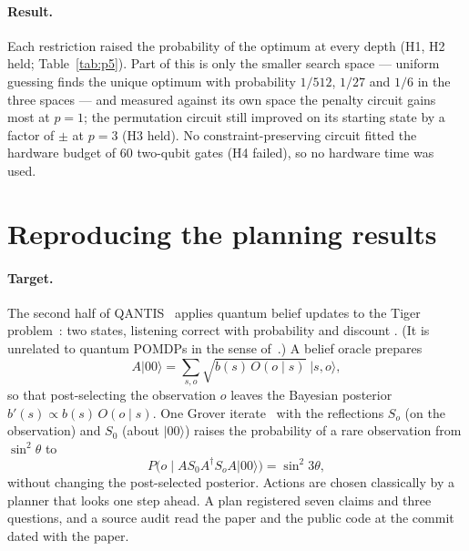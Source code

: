 \documentclass[11pt,a4paper]{article}
\begin{document}
\paragraph{Result.} Each restriction raised the probability of the optimum at every depth (H1, H2 held; Table~\ref{tab:p5}). Part of this is
only the smaller search space --- uniform guessing finds the unique optimum with probability $1/512$, $1/27$ and $1/6$ in the three spaces ---
and measured against its own space the penalty circuit gains most at $p=1$; the permutation circuit still improved on its starting state
by a factor of \PfivePermLift{} $\pm$ \PfivePermLiftSE{} at $p=3$ (H3 held). No constraint-preserving circuit fitted the hardware budget of
60 two-qubit gates (H4 failed), so no hardware time was used.

\section{Reproducing the planning results}\label{sec:p6}

\paragraph{Target.} The second half of QANTIS~\cite{eker2026qantis} applies quantum belief updates to the Tiger
problem~\cite{kaelbling1998planning}: two states, listening correct with probability \PsixPaperListen{} and discount \PsixPaperGamma. (It
is unrelated to quantum POMDPs in the sense of~\cite{barry2014qpomdp}.) A belief oracle prepares
\begin{equation}
A\lvert00\rangle = \sum_{s,o}\sqrt{b(s)\,O(o\mid s)}\;\lvert s,o\rangle ,
\end{equation}
so that post-selecting the observation $o$ leaves the Bayesian posterior $b'(s)\propto b(s)\,O(o\mid s)$. One Grover
iterate~\cite{grover1996,brassard2002amplitude} with the reflections $S_o$ (on the observation) and $S_0$ (about $\lvert00\rangle$) raises the
probability of a rare observation from $\sin^2\theta$ to
\begin{equation}
P\bigl(o \mid A S_0 A^\dagger S_o A\lvert00\rangle\bigr) = \sin^2 3\theta ,
\end{equation}
without changing the post-selected posterior. Actions are chosen classically by a planner that looks one step ahead. A plan registered
seven claims and three questions, and a source audit read the paper and the public code at the commit dated with the paper.
\end{document}
